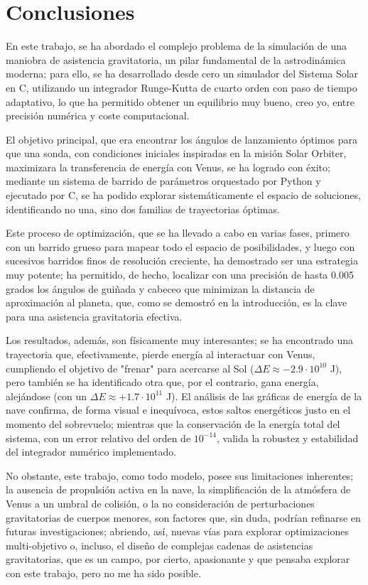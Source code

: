 \section{Conclusiones}
En este trabajo, se ha abordado el complejo problema de la simulación de una maniobra de asistencia gravitatoria, 
un pilar fundamental de la astrodinámica moderna; para ello, se ha desarrollado desde cero un 
simulador del Sistema Solar en C, utilizando un integrador Runge-Kutta de cuarto orden con paso de tiempo adaptativo, 
lo que ha permitido obtener un equilibrio muy bueno, creo yo, entre precisión numérica y coste computacional.

El objetivo principal, que era encontrar los ángulos de lanzamiento óptimos para que una sonda, 
con condiciones iniciales inspiradas en la misión Solar Orbiter, maximizara la transferencia de energía con 
Venus, se ha logrado con éxito; mediante un sistema de barrido de parámetros orquestado por Python y ejecutado por C, 
se ha podido explorar sistemáticamente el espacio de soluciones, identificando no una, sino dos familias de 
trayectorias óptimas.

Este proceso de optimización, que se ha llevado a cabo en varias fases, primero con un barrido grueso 
para mapear todo el espacio de posibilidades, y luego con sucesivos barridos finos de resolución creciente, 
ha demostrado ser una estrategia muy potente; ha permitido, de hecho, localizar con una precisión de hasta 0.005 
grados los ángulos de guiñada y cabeceo que minimizan la distancia de aproximación al planeta, que, como se demostró 
en la introducción, es la clave para una asistencia gravitatoria efectiva.

Los resultados, además, son físicamente muy interesantes; se ha encontrado una trayectoria que, efectivamente, 
pierde energía al interactuar con Venus, cumpliendo el objetivo de "frenar" para acercarse al Sol
($\Delta E \approx -2.9 \cdot 10^{10}$ J), pero también 
se ha identificado otra que, por el contrario, gana energía, alejándose (con un $\Delta E \approx +1.7 \cdot 10^{11}$ J). 
El análisis de las gráficas de energía de la nave confirma, de forma visual e inequívoca, estos saltos energéticos 
justo en el momento del sobrevuelo; mientras que la conservación de la energía total del sistema, con un error 
relativo del orden de $10^{-14}$, valida la robustez y estabilidad del integrador numérico implementado.

No obstante, este trabajo, como todo modelo, posee sus limitaciones inherentes; la ausencia de propulsión activa 
en la nave, la simplificación de la atmósfera de Venus a un umbral de colisión, o la no consideración de perturbaciones 
gravitatorias de cuerpos menores, son factores que, sin duda, podrían refinarse en futuras investigaciones; 
abriendo, así, nuevas vías para explorar optimizaciones multi-objetivo o, incluso, el diseño de complejas 
cadenas de asistencias gravitatorias, que es un campo, por cierto, apasionante y que pensaba explorar con este 
trabajo, pero no me ha sido posible.


